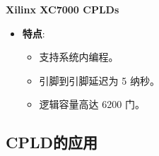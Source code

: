 \begin{frame}[allowframebreaks]{\textbf{Xilinx XC7000 CPLDs}}
\begin{itemize}
    \begin{itemize}
    \tightlist
    \item
    \textbf{特点}:

    \begin{itemize}
    \tightlist
    \item
        支持系统内编程。
    \item
        引脚到引脚延迟为 5 纳秒。
    \item
        逻辑容量高达 6200 门。
    \end{itemize}
    \end{itemize}
\end{itemize}
\end{frame}

\subsection{CPLD的应用}
